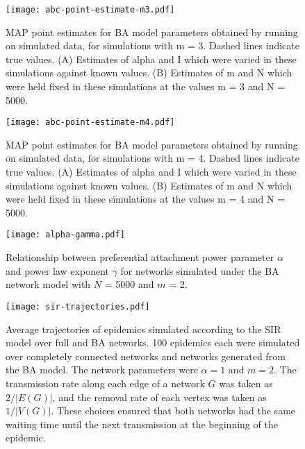 \begin{figure}[ht]
  \centering
  \texttt{[image: abc-point-estimate-m3.pdf]}
  \caption[
    \Acrlong{MAP} point estimates for \gls{BA} model parameters obtained by
    running  on simulated data, for simulations with \gls{m} = 3.
  ]{
    \Acrlong{MAP} point estimates for \gls{BA} model parameters obtained by
    running  on simulated data, for simulations with \gls{m} = 3.
    Dashed lines indicate true values. (A) Estimates of \gls{alpha} and \gls{I}
    which were varied in these simulations against known values. (B) Estimates
    of \gls{m} and \gls{N} which were held fixed in these simulations at the
    values \gls{m} = 3 and \gls{N} = 5000.
  }        
  \label{fig:abcptm3}
\end{figure}

\begin{figure}[ht]
  \centering
  \texttt{[image: abc-point-estimate-m4.pdf]}
  \caption[
    \Acrlong{MAP} point estimates for \gls{BA} model parameters obtained by
    running  on simulated data, for simulations with \gls{m} = 3.
  ]{
    \Acrlong{MAP} point estimates for \gls{BA} model parameters obtained by
    running  on simulated data, for simulations with \gls{m} = 4.
    Dashed lines indicate true values. (A) Estimates of \gls{alpha} and \gls{I}
    which were varied in these simulations against known values. (B) Estimates
    of \gls{m} and \gls{N} which were held fixed in these simulations at the
    values \gls{m} = 4 and \gls{N} = 5000.
  }        
  \label{fig:abcptm4}
\end{figure}

\begin{figure}[ht]
  \centering
  \texttt{[image: alpha-gamma.pdf]}
  \caption{
      Relationship between preferential attachment power parameter $\alpha$
      and power law exponent $\gamma$ for networks simulated under the BA
      network model with $N$ = 5000 and $m$ = 2.
  }
  \label{fig:gamma}
\end{figure}

\begin{figure}[ht]
  \centering
  \texttt{[image: sir-trajectories.pdf]}
  \caption[Average trajectories of epidemics simulated according to the
  \gls{SIR} model over full and \gls{BA} networks.]
  {
      Average trajectories of epidemics simulated according to the \gls{SIR}
      model over full and \gls{BA} networks. 100 epidemics each were simulated
      over completely connected networks and networks generated from the
      \gls{BA} model. The network parameters were $\alpha = 1$ and $m = 2$.
      The transmission rate along each edge of a network $G$ was taken as
      $2/|E(G)|$, and the removal rate of each vertex was taken as $1/|V(G)|$.
      These choices ensured that both networks had the same waiting time until
      the next transmission at the beginning of the epidemic.
  }
  \label{fig:sir}
\end{figure}

